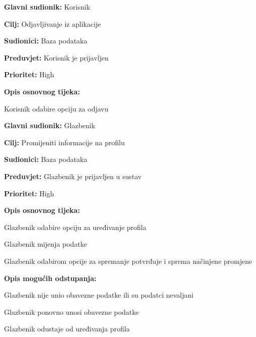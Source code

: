 \noindent {}
	\begin{packed_item}
	   	
	   	\item \textbf{Glavni sudionik: } Korisnik
	   	\item \textbf{Cilj:} Odjavljivanje iz aplikacije
	   	\item \textbf{Sudionici:} Baza podataka
	   	\item \textbf{Preduvjet:} Korisnik je prijavljen
	   	\item \textbf{Prioritet:} High
	   	\item \textbf{Opis osnovnog tijeka:} 
	   	
	   	\item[] \begin{packed_enum}
	   		
	   		\item Korisnik odabire opciju za odjavu
	   		
	   	\end{packed_enum}
	\end{packed_item}	 

\noindent {}
	\begin{packed_item}
		
		\item \textbf{Glavni sudionik:} Glazbenik
		\item \textbf{Cilj:} Promijeniti informacije na profilu
		\item \textbf{Sudionici:} Baza podataka
		\item \textbf{Preduvjet:} Glazbenik je prijavljen u sustav
		\item \textbf{Prioritet:} High
		\item \textbf{Opis osnovnog tijeka:}
		
		\item[] \begin{packed_enum}
			\item Glazbenik odabire opciju za uređivanje profila 
			\item Glazbenik mijenja podatke
			\item Glazbenik odabirom opcije za spremanje potvrđuje i sprema načinjene promjene
		\end{packed_enum}
	
		\item  \textbf{Opis mogućih odstupanja:}
		\item[] \begin{packed_item}
			
			\item[3.a] Glazbenik nije unio obavezne podatke ili su podatci nevaljani
			\item[] \begin{packed_enum}
				
				\item Glazbenik ponovno unosi obavezne podatke
				\item Glazbenik odustaje od uređivanja profila
				
			\end{packed_enum}	
		\end{packed_item}
	\end{packed_item}
	
